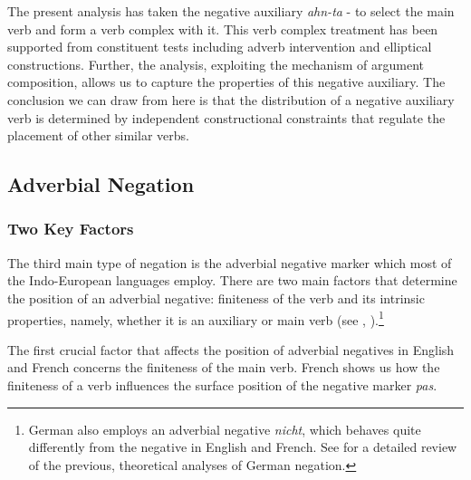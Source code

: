 \documentclass[output=paper]{langsci/langscibook}
\begin{document}
{The present analysis has taken the negative auxiliary {\it ahn-ta} \NEG-\DECL
to select the main verb and form a verb complex with it.
This verb complex treatment has been supported from
constituent tests including
 adverb intervention and elliptical constructions. Further, the analysis,
exploiting the mechanism of argument composition,
allows us to capture the properties of this negative
auxiliary.
The conclusion we can draw from here is that the
 distribution of a negative auxiliary verb is determined by
independent constructional constraints
that regulate the placement of other
similar verbs.



\subsection{Adverbial Negation}

\subsubsection{Two Key Factors}

The third main type of negation is
the adverbial negative marker which most of the Indo-European
languages employ. There are two main factors
that determine the position of an adverbial negative: finiteness of
the verb and its intrinsic properties, namely, whether it is an auxiliary
or main verb (see \citet{Kim:00}, \citet{KS:02}).\footnote{German also
employs an adverbial negative {\it nicht}, which behaves quite
differently from the negative in English and French. See \citet{MuellerGT-Eng1}
for a detailed review of the previous, theoretical analyses of German negation.}


The first crucial factor that affects  the position of adverbial
negatives in English and French concerns the finiteness of the main verb.
French shows us how the finiteness of a verb influences the
surface position of the negative marker {\it pas}.



\eal{}
\zl


}
\end{document}
